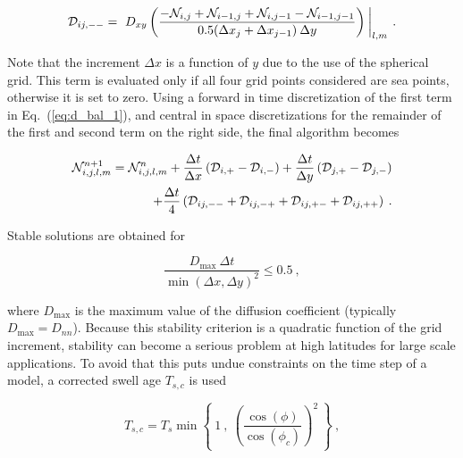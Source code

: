 
\begin{equation}
{\cal D}_{ij,--} = \left . \: D_{xy} 
\left ( \frac{- {\cal N}_{i,j} + {\cal N}_{i-1,j} +
              {\cal N}_{i,j-1} - {\cal N}_{i-1,j-1}}
           {0.5 ( \Delta x_j + \Delta x_{j-1} ) \: \Delta y}
              \right ) \: \right |_{l,m} 
\: . \label{eq:ddif_2} \end{equation}

\noindent
Note that the increment $\Delta x$ is a function of $y$ due to the use of the
spherical grid. This term is evaluated only if all four grid points considered
are sea points, otherwise it is set to zero. Using a forward in time
discretization of the first term in Eq.~(\ref{eq:d_bal_1}), and central in
space discretizations for the remainder of the first and second term on the
right side, the final algorithm becomes


\begin{eqnarray}
{\cal N}_{i,j,l,m}^{n+1} = {\cal N}_{i,j,l,m}^n + 
\frac{\Delta t}{\Delta x} 
   \left ( {\cal D}_{i,+} - {\cal D}_{i,-} \right ) +
\frac{\Delta t}{\Delta y}
   \left ( {\cal D}_{j,+} - {\cal D}_{j,-} \right ) \nonumber \\
+ \frac{\Delta t}{4} \left ( {\cal D}_{ij,--} + 
   {\cal D}_{ij,-+} + {\cal D}_{ij,+-} + {\cal D}_{ij,++} \right )
\: . \label{eq:ddif_3} \end{eqnarray}

\noindent
Stable solutions are obtained for \citep[e.g.,][Part I section
7.1.1]{bk:Fle88}


\begin{equation}
\frac{D_{\max} \: \Delta t}{\min(\Delta x , \Delta y)^2}
\leq 0.5 \: , \label{eq:ddif_4} \end{equation}

\noindent
where $D_{\max}$ is the maximum value of the diffusion coefficient (typically
$D_{\max} = D_{nn}$). Because this stability criterion is a quadratic function
of the grid increment, stability can become a serious problem at high
latitudes for large scale applications. To avoid that this puts undue
constraints on the time step of a model, a corrected swell age $T_{s,c}$ is
used


\begin{equation}
T_{s,c} = T_s \min \left \{ \: 1 \: , \: 
\left ( \frac{\cos(\phi)}{\cos(\phi_c)} \right )^2 \: \right \}
\: , \label{eq:Ts_cor} \end{equation}

